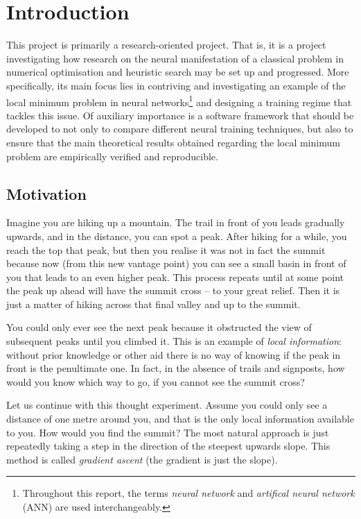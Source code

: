 \chapter{Introduction}

This project is primarily a research-oriented project. 
That is, it is a project investigating how research on the neural manifestation of a classical problem in numerical optimisation and heuristic search may be set up and progressed.
More specifically, its main focus lies in contriving and investigating an example of the local minimum problem in neural networks\footnote{Throughout this report, the terms \textit{neural network} and \textit{artifical neural network} (ANN) are used interchangeably.} and designing a training regime that tackles this issue. 
Of auxiliary importance is a software framework that should be developed to not only to compare different neural training techniques, but also to ensure that the main theoretical results obtained regarding the local minimum problem are empirically verified and reproducible.

\section{Motivation}
\label{sec:motivation}
Imagine you are hiking up a mountain.
The trail in front of you leads gradually upwards, and in the distance, you can spot a peak.
After hiking for a while, you reach the top that peak, but then you realise it was not in fact the summit because now (from this new vantage point) you can see a small basin in front of you that leads to an even higher peak. 
This process repeats until at some point the peak up ahead will have the summit cross -- to your great relief. 
Then it is just a matter of hiking across that final valley and up to the summit.

You could only ever see the next peak because it obstructed the view of subsequent peaks until you climbed it.
This is an example of \textit{local information}: without prior knowledge or other aid there is no way of knowing if the peak in front is the penultimate one.
In fact, in the absence of trails and signposts, how would you know which way to go, if you cannot see the summit cross?

Let us continue with this thought experiment. 
Assume you could only see a distance of one metre around you, and that is the only local information available to you.
How would you find the summit?
The most natural approach is just repeatedly taking a step in the direction of the steepest upwards slope.
This method is called \textit{gradient ascent} (the gradient is just the slope).

